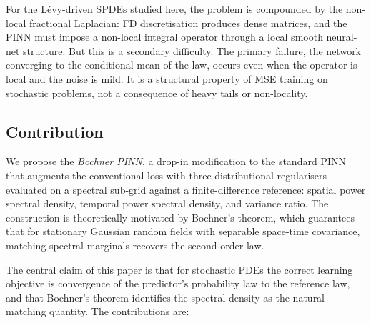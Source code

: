 \documentclass[10pt]{elsarticle}
\begin{document}
For the Lévy-driven SPDEs studied here, the problem is compounded by
the non-local fractional Laplacian: FD discretisation produces dense
matrices, and the PINN must impose a non-local integral operator
through a local smooth neural-net structure. But this is a secondary
difficulty. The primary failure, the network converging to the
conditional mean of the law, occurs even when the operator is local
and the noise is mild. It is a structural property of MSE training on
stochastic problems, not a consequence of heavy tails or non-locality.

\subsection{Contribution}
\label{subsec:contribution}

We propose the \emph{Bochner PINN}, a drop-in modification to the
standard PINN that augments the conventional loss with three
distributional regularisers evaluated on a spectral sub-grid against a
finite-difference reference: spatial power spectral density, temporal
power spectral density, and variance ratio. The construction is
theoretically motivated by Bochner's theorem, which guarantees that
for stationary Gaussian random fields with separable space-time
covariance, matching spectral marginals recovers the second-order law.

The central claim of this paper is that for stochastic PDEs the
correct learning objective is convergence of the predictor's
probability law to the reference law, and that Bochner's theorem
identifies the spectral density as the natural matching quantity.
The contributions are:
\end{document}
